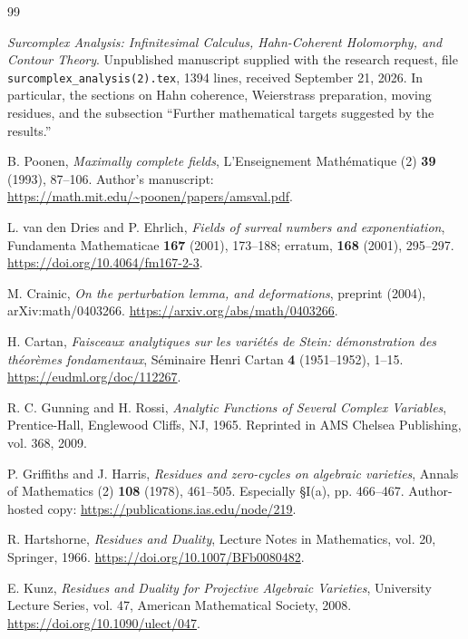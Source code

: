 \documentclass[11pt,letterpaper]{article}
\theoremstyle{definition}
\theoremstyle{remark}
\begin{document}
\begingroup
\small
\setlength{\parskip}{0pt}
\begin{thebibliography}{99}
\setlength{\itemsep}{0.4em}

\emph{Surcomplex Analysis: Infinitesimal Calculus, Hahn-Coherent Holomorphy, and Contour Theory}.
Unpublished manuscript supplied with the research request, file
\texttt{surcomplex\_analysis(2).tex}, 1394 lines, received September 21, 2026.
In particular, the sections on Hahn coherence, Weierstrass preparation, moving residues, and the subsection ``Further mathematical targets suggested by the results.''

B. Poonen, \emph{Maximally complete fields},
L'Enseignement Math\'ematique (2) \textbf{39} (1993), 87--106.
Author's manuscript: \url{https://math.mit.edu/~poonen/papers/amsval.pdf}.

L. van den Dries and P. Ehrlich, \emph{Fields of surreal numbers and exponentiation},
Fundamenta Mathematicae \textbf{167} (2001), 173--188;
erratum, \textbf{168} (2001), 295--297.
\url{https://doi.org/10.4064/fm167-2-3}.

M. Crainic, \emph{On the perturbation lemma, and deformations},
preprint (2004), arXiv:math/0403266.
\url{https://arxiv.org/abs/math/0403266}.

H. Cartan, \emph{Faisceaux analytiques sur les vari\'et\'es de Stein:
 d\'emonstration des th\'eor\`emes fondamentaux},
S\'eminaire Henri Cartan \textbf{4} (1951--1952), 1--15.
\url{https://eudml.org/doc/112267}.

R. C. Gunning and H. Rossi,
\emph{Analytic Functions of Several Complex Variables},
Prentice-Hall, Englewood Cliffs, NJ, 1965.
Reprinted in AMS Chelsea Publishing, vol. 368, 2009.

P. Griffiths and J. Harris, \emph{Residues and zero-cycles on algebraic varieties},
Annals of Mathematics (2) \textbf{108} (1978), 461--505.
Especially \S I(a), pp. 466--467.
Author-hosted copy: \url{https://publications.ias.edu/node/219}.

R. Hartshorne, \emph{Residues and Duality},
Lecture Notes in Mathematics, vol. 20, Springer, 1966.
\url{https://doi.org/10.1007/BFb0080482}.

E. Kunz, \emph{Residues and Duality for Projective Algebraic Varieties},
University Lecture Series, vol. 47, American Mathematical Society, 2008.
\url{https://doi.org/10.1090/ulect/047}.


\end{thebibliography}
\end{document}
